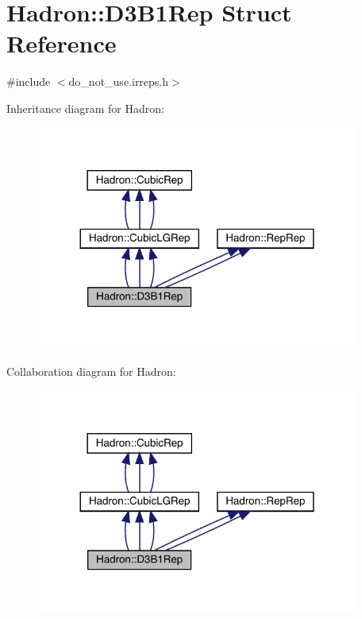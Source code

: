 \hypertarget{structHadron_1_1D3B1Rep}{}\section{Hadron\+:\+:D3\+B1\+Rep Struct Reference}
\label{structHadron_1_1D3B1Rep}


{\ttfamily \#include $<$do\+\_\+not\+\_\+use.\+irreps.\+h$>$}



Inheritance diagram for Hadron\+:
\nopagebreak
\begin{figure}[H]
\begin{center}
\leavevmode
\includegraphics[width=300pt]{dd/d7b/structHadron_1_1D3B1Rep__inherit__graph}
\end{center}
\end{figure}


Collaboration diagram for Hadron\+:
\nopagebreak
\begin{figure}[H]
\begin{center}
\leavevmode
\includegraphics[width=300pt]{df/df0/structHadron_1_1D3B1Rep__coll__graph}
\end{center}
\end{figure}
